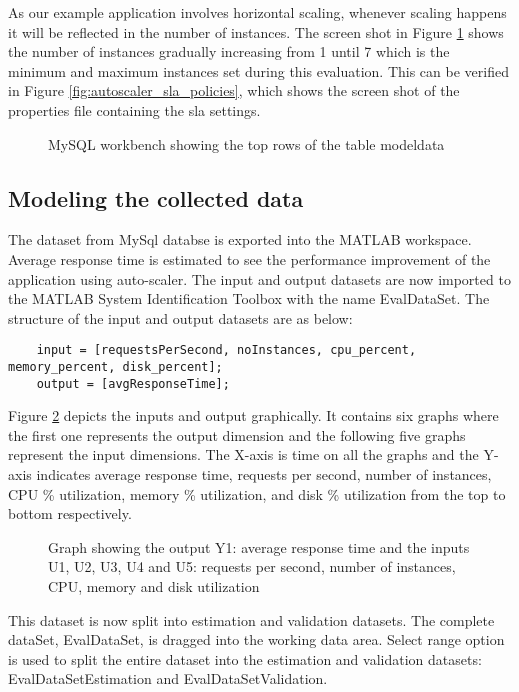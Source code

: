 \documentclass[article,type=msc,colorback,12pt,accentcolor=tud8b,table]{tudthesis}
\begin{document}
		As our example application involves horizontal scaling, whenever scaling happens it will be reflected in the number of instances. The screen shot in Figure \ref{fig:db_rows} shows the number of instances gradually increasing from 1 until 7 which is the minimum and maximum instances set during this evaluation. This can be verified in Figure \ref{fig:autoscaler_sla_policies}, which shows the screen shot of the properties file containing the \gls{sla} settings. 

	
		  	  \begin{figure}[H]
		  	  	\begin{center}
		  	  		\makebox[\textwidth]{\texttt{[image: E6]}}
		  	  	\end{center}
		  	  	\caption{MySQL workbench showing the top rows of the table modeldata}
		  	  	\label{fig:db_rows}
		  	  \end{figure}
		  	 	
	\subsection{Modeling the collected data}
	
	The dataset from MySql databse is exported into the MATLAB workspace. Average response time is estimated to see the performance improvement of the application using auto-scaler. The input and output datasets are now imported to the MATLAB System Identification Toolbox with the name EvalDataSet. The structure of the input and output datasets are as below:
	
	\begin{lstlisting} 
	input = [requestsPerSecond, noInstances, cpu_percent, memory_percent, disk_percent];
	output = [avgResponseTime];
	\end{lstlisting} 
	
	Figure \ref{fig:output_responsetime_input_5} depicts the inputs and output graphically. It contains six graphs where the first one represents the output dimension and the following five graphs represent the input dimensions. The X-axis is time on all the graphs and the Y-axis indicates average response time, requests per second, number of instances, CPU \% utilization, memory \% utilization, and disk \% utilization from the top to bottom respectively.
	
\begin{figure}
	\begin{center}
	\end{center}
	\caption{Graph showing the output Y1: average response time and the inputs U1, U2, U3, U4 and U5: requests per second, number of instances, CPU, memory and disk utilization }
	\label{fig:output_responsetime_input_5}
\end{figure}
This dataset is now split into estimation and validation datasets. The complete dataSet, EvalDataSet, is dragged into the working data area. Select range option is used to split the entire dataset into the estimation and validation datasets: EvalDataSetEstimation and EvalDataSetValidation. 
\end{document}
